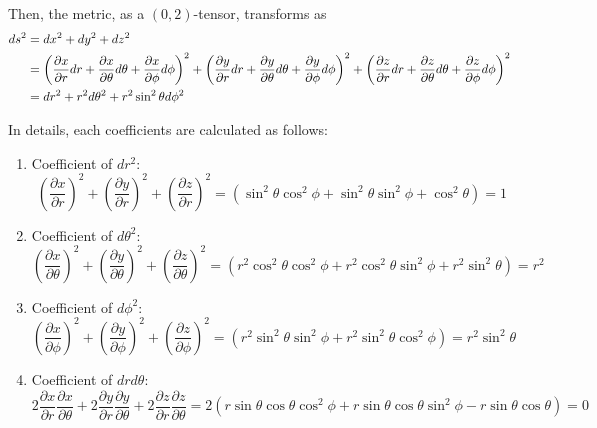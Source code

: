 \documentclass[a4paper,11pt]{article}
\begin{document}
Then, the metric, as a $(0, 2)$-tensor, transforms as
\begin{align}
    ds^2 &= dx^2 + dy^2 + dz^2 \notag\\
    &= \left(\frac{\partial x}{\partial r} dr + \frac{\partial x}{\partial \theta} d\theta + \frac{\partial x}{\partial \phi} d\phi\right)^2 + \left(\frac{\partial y}{\partial r} dr + \frac{\partial y}{\partial \theta} d\theta + \frac{\partial y}{\partial \phi} d\phi\right)^2 + \left(\frac{\partial z}{\partial r} dr + \frac{\partial z}{\partial \theta} d\theta + \frac{\partial z}{\partial \phi} d\phi\right)^2 \notag\\
    &= dr^2 + r^2 d\theta^2 + r^2 \sin^2\theta d\phi^2
\end{align}

In details, each coefficients are calculated as follows:
\begin{enumerate}
    \item Coefficient of $dr^2$:
    \begin{equation}
        \left(\frac{\partial x}{\partial r}\right)^2 + \left(\frac{\partial y}{\partial r}\right)^2 + \left(\frac{\partial z}{\partial r}\right)^2 = (\sin^2\theta \cos^2\phi + \sin^2\theta \sin^2\phi + \cos^2\theta) = 1
    \end{equation}
    \item Coefficient of $d\theta^2$:
    \begin{equation}
        \left(\frac{\partial x}{\partial \theta}\right)^2 + \left(\frac{\partial y}{\partial \theta}\right)^2 + \left(\frac{\partial z}{\partial \theta}\right)^2 = (r^2\cos^2\theta\cos^2\phi + r^2\cos^2\theta\sin^2\phi + r^2\sin^2\theta) = r^2
    \end{equation}
    \item Coefficient of $d\phi^2$:
    \begin{equation}
        \left(\frac{\partial x}{\partial \phi}\right)^2 + \left(\frac{\partial y}{\partial \phi}\right)^2 + \left(\frac{\partial z}{\partial \phi}\right)^2 = (r^2\sin^2\theta\sin^2\phi + r^2\sin^2\theta\cos^2\phi) = r^2\sin^2\theta
    \end{equation}
    \item Coefficient of $dr d\theta$:
    \begin{equation}
        2\frac{\partial x}{\partial r}\frac{\partial x}{\partial \theta} + 2\frac{\partial y}{\partial r}\frac{\partial y}{\partial \theta} + 2\frac{\partial z}{\partial r}\frac{\partial z}{\partial \theta} = 2(r\sin\theta\cos\theta\cos^2\phi + r\sin\theta\cos\theta\sin^2\phi - r\sin\theta\cos\theta) = 0

\end{equation}
\end{enumerate}
\end{document}
